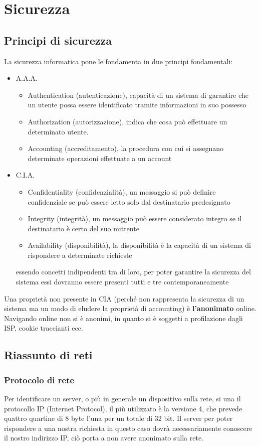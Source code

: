 \chapter{Sicurezza}

\section{Principi di sicurezza}
La sicurezza informatica pone le fondamenta in due principi fondamentali:
\begin{itemize}
    \item A.A.A.
    \begin{itemize}
        \item Authentication (autenticazione), capacità di un sistema di garantire che un utente possa essere identificato tramite informazioni in suo possesso
        \item Authorization (autorizzazione), indica che cosa può effettuare un determinato utente.
        \item Accounting (accreditamento), la procedura con cui si assegnano determinate operazioni effettuate a un account
    \end{itemize}
    \item C.I.A.
    \begin{itemize}
        \item Confidentiality (confidenzialità), un messaggio si può definire confidenziale se può essere letto solo dal destinatario predesignato
        \item Integrity (integrità), un messaggio può essere considerato integro se il destinatario è certo del suo mittente
        \item Availability (disponibilità), la disponibilità è la capacità di un sistema di rispondere a determinate richieste
    \end{itemize}
    essendo concetti indipendenti tra di loro, per poter garantire la sicurezza del sistema essi dovranno essere presenti tutti e tre contemporaneamente
\end{itemize}
Una proprietà non presente in CIA (perché non rappresenta la sicurezza di un sistema ma un modo di eludere la proprietà di accounting) è \textbf{l'anonimato} online.
Navigando online non si è anonimi, in quanto si è soggetti a profilazione dagli ISP, cookie traccianti ecc.
\section{Riassunto di reti}
\subsection{Protocolo di rete}
Per identificare un server, o più in generale un dispositivo sulla rete, si una il protocollo IP (Internet Protocol), il più utilizzato è la versione 4, che prevede quattro quartine di 8 byte l'una per un totale di 32 bit. Il server per poter rispondere a una nostra richiesta in questo caso dovrà necessariamente conoscere il nostro indirizzo IP, ciò porta a non avere anonimato sulla rete.

